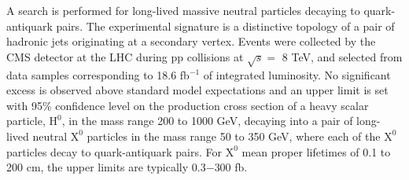 A search is performed for long-lived massive neutral particles decaying
 to quark-antiquark pairs. The experimental signature is a distinctive topology of a pair of
 hadronic jets originating at a
 secondary vertex.
 Events were collected by the CMS detector at the LHC during pp collisions at $\sqrt{s}=$ 8 TeV, and selected from data samples corresponding to 18.6 fb$^{-1}$ of integrated luminosity. No significant excess
 is observed above standard model expectations and an upper limit is set with 95$\%$ confidence level
 on the production cross section of a heavy scalar particle,
  $\text{H}^0$, in the mass range 200 to 1000 GeV, decaying into a pair of long-lived neutral $\text{X}^0$
   particles in the mass
   range 50 to 350 GeV, where each of the $\text{X}^0$ particles decay to quark-antiquark pairs. For $\text{X}^0$ mean proper lifetimes
   of 0.1 to 200 cm,
    the upper limits are typically 0.3$-$300 fb.

